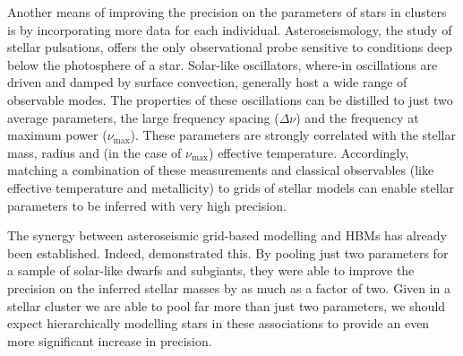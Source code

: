 \documentclass[fleqn,usenatbib]{mnras}
\newcommand{\numax}{\nu_{\mathrm{max}}}
\newcommand{\Dnu}{\Delta\nu}
\begin{document}






Another means of improving the precision on the parameters of stars in clusters is by incorporating more data for each individual. Asteroseismology, the study of stellar pulsations, offers the only observational probe sensitive to conditions deep below the photosphere of a star. Solar-like oscillators, where-in oscillations are driven and damped by surface convection, generally host a wide range of observable modes. The properties of these oscillations can be distilled to just two average parameters, the large frequency spacing ($\Dnu$) and the frequency at maximum power ($\numax$). These parameters are strongly correlated with the stellar mass, radius and (in the case of $\numax$) effective temperature. Accordingly, matching a combination of these measurements and classical observables (like effective temperature and metallicity) to grids of stellar models can enable stellar parameters to be inferred with very high precision. 


The synergy between asteroseismic grid-based modelling and HBMs has already been established. Indeed, \citep{2021MNRAS.505.2427L} demonstrated this. By pooling just two parameters for a sample of solar-like dwarfs and subgiants, they were able to improve the precision on the inferred stellar masses by as much as a factor of two. Given in a stellar cluster we are able to pool far more than just two parameters, we should expect hierarchically modelling stars in these associations to provide an even more significant increase in precision.
\end{document}
